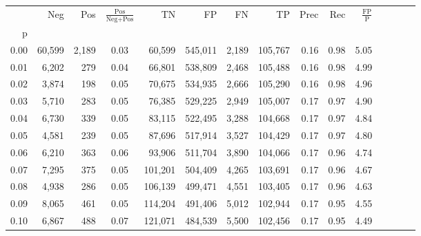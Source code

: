 \begin{tabular}{rrrcrrrrrrrrrrr}
\toprule
{} &     Neg &     Pos & $\frac{\text{Pos}}{\text{Neg}+\text{Pos}}$ &       TN &       FP &       FN &       TP &  Prec &   Rec & $\frac{\text{FP}}{\text{P}}$ \\
p    &         &         &                                            &          &          &          &          &       &       &                              \\
\midrule
0.00 &  60,599 &   2,189 &                                       0.03 &   60,599 &  545,011 &    2,189 &  105,767 &  0.16 &  0.98 &                         5.05 \\
0.01 &   6,202 &     279 &                                       0.04 &   66,801 &  538,809 &    2,468 &  105,488 &  0.16 &  0.98 &                         4.99 \\
0.02 &   3,874 &     198 &                                       0.05 &   70,675 &  534,935 &    2,666 &  105,290 &  0.16 &  0.98 &                         4.96 \\
0.03 &   5,710 &     283 &                                       0.05 &   76,385 &  529,225 &    2,949 &  105,007 &  0.17 &  0.97 &                         4.90 \\
0.04 &   6,730 &     339 &                                       0.05 &   83,115 &  522,495 &    3,288 &  104,668 &  0.17 &  0.97 &                         4.84 \\
0.05 &   4,581 &     239 &                                       0.05 &   87,696 &  517,914 &    3,527 &  104,429 &  0.17 &  0.97 &                         4.80 \\
0.06 &   6,210 &     363 &                                       0.06 &   93,906 &  511,704 &    3,890 &  104,066 &  0.17 &  0.96 &                         4.74 \\
0.07 &   7,295 &     375 &                                       0.05 &  101,201 &  504,409 &    4,265 &  103,691 &  0.17 &  0.96 &                         4.67 \\
0.08 &   4,938 &     286 &                                       0.05 &  106,139 &  499,471 &    4,551 &  103,405 &  0.17 &  0.96 &                         4.63 \\
0.09 &   8,065 &     461 &                                       0.05 &  114,204 &  491,406 &    5,012 &  102,944 &  0.17 &  0.95 &                         4.55 \\
0.10 &   6,867 &     488 &                                       0.07 &  121,071 &  484,539 &    5,500 &  102,456 &  0.17 &  0.95 &                         4.49 \\

\end{tabular}
